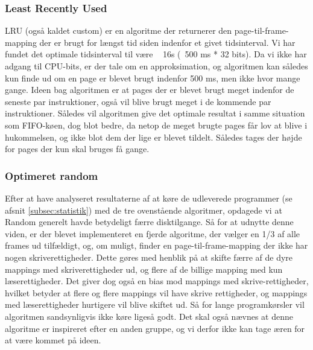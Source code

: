 	\subsubsection{Least Recently Used}
	LRU (også kaldet custom) er en algoritme der returnerer den page-til-frame-mapping der er brugt for længst tid siden indenfor et givet tidsinterval.  Vi har fundet det optimale tidsinterval til være ~ 16s (~500 ms * 32 bits). Da vi ikke har adgang til CPU-bits, er der tale om en approksimation, og algoritmen kan således kun finde ud om en page er blevet brugt indenfor 500 ms, men ikke hvor mange gange. Ideen bag algoritmen er at pages der er blevet brugt meget indenfor de seneste par instruktioner, også vil blive brugt meget i de kommende par instruktioner. Således vil algoritmen give det optimale resultat i samme situation som FIFO-køen, dog blot bedre, da netop de meget brugte pages får lov at blive i hukommelsen, og ikke blot dem der lige er blevet tildelt. Således tages der højde for pages der kun skal bruges få gange.

	\subsubsection{Optimeret random}
	Efter at have analyseret resultaterne af at køre de udleverede programmer (se afsnit \ref{subsec:statistik}) med de tre ovenstående algoritmer, opdagede vi at Random generelt havde betydeligt færre disktilgange. Så for at udnytte denne viden, er der blevet implementeret en fjerde algoritme, der vælger en 1/3 af alle frames ud tilfældigt, og, om muligt, finder en page-til-frame-mapping der ikke har nogen skriverettigheder. Dette gøres med henblik på at skifte færre af de dyre mappings med skriverettigheder ud, og flere af de billige mapping med kun læserettigheder. Det giver dog også en bias mod mappings med skrive-rettigheder, hvilket betyder at flere og flere mappings vil have skrive rettigheder, og mappings med læserettigheder hurtigere vil blive skiftet ud. Så for lange programkørsler vil algoritmen sandsynligvis ikke køre ligeså godt. Det skal også nævnes at denne algoritme er inspireret efter en anden gruppe, og vi derfor ikke kan tage æren for at være kommet på ideen. 
